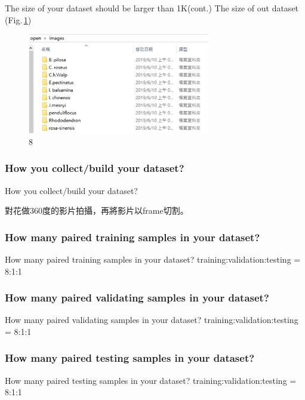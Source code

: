 \documentclass{beamer}
\begin{document}
\begin{frame}{The size of your dataset should be larger than 1K(cont.)}
The size of out dataset (Fig.\,\ref{fig:8})
 \begin{figure}
    \includegraphics[width=8cm]{dataset(2).png}
    \caption{8}
    \label{fig:8}
  \end{figure}

\end{frame}

\subsubsection{How you collect/build your dataset?}
\begin{frame}{How you collect/build your dataset?}
  \begin{CJK}{UTF8}{bkai}
	對花做360度的影片拍攝，再將影片以frame切割。
   \end{CJK}
\end{frame}

\subsubsection{How many paired training samples in your dataset?}
\begin{frame}{How many paired training samples in your dataset?}
training:validation:testing = 8:1:1
\end{frame}

\subsubsection{How many paired validating samples in your dataset?}
\begin{frame}{How many paired validating samples in your dataset?}
training:validation:testing = 8:1:1
\end{frame}

\subsubsection{How many paired testing samples in your dataset?}
\begin{frame}{How many paired testing samples in your dataset?}
training:validation:testing = 8:1:1
\end{frame}
\end{document}
